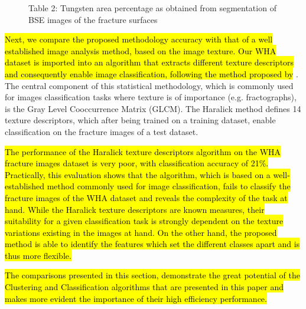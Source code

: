 \documentclass[authoryear,preprint,review,12pt, singleside]{elsarticle}
\begin{document}
\begin{figure}[!h]
	\centering
	\caption{Table 2: Tungsten area percentage as obtained from segmentation of BSE images of the fracture surfaces}
	\label{fig:T2}
\end{figure}

\hl{Next, we compare the proposed methodology accuracy with that of a well established image analysis method, based on the image texture. Our WHA dataset is imported into an algorithm that extracts different texture descriptors and consequently enable image classification, following the method proposed by} \citet{haralick}. The central component of this statistical methodology, which is commonly used for images classification tasks where texture is of importance (e.g. fractographs), is the Gray Level Cooccurrence Matrix (GLCM). The Haralick method defines 14 texture descriptors, which after being trained on a training dataset, enable classification on the fracture images of a test dataset. 

\hl{The performance of the Haralick texture descriptors algorithm on the WHA fracture images dataset is very poor, with classification accuracy of 21\%. Practically, this evaluation shows that the algorithm, which is based on a well-established method commonly used for image classification, fails to classify the fracture images of the WHA dataset and reveals the complexity of the task at hand. While the Haralick texture descriptors are known measures, their suitability for a given classification task is strongly dependent on the texture variations existing in the images at hand. On the other hand, the proposed method is able to identify the features which set the different classes apart and is thus more flexible.}

\hl{The comparisons presented in this section,  demonstrate the great potential of the Clustering and Classification algorithms that are presented in this paper and makes more evident the importance of their high efficiency performance.}
\end{document}
